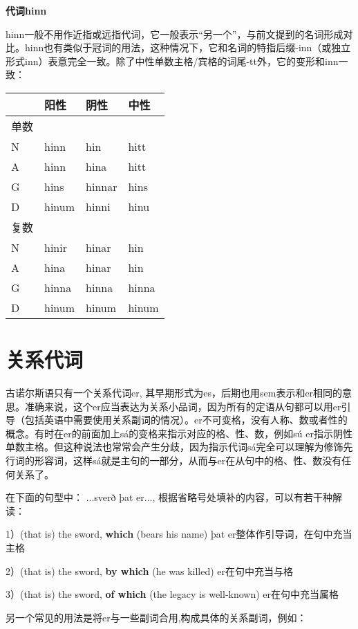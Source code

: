 \textbf{代词hinn}

hinn一般不用作近指或远指代词，它一般表示``另一个''，与前文提到的名词形成对比。hinn也有类似于冠词的用法，这种情况下，它和名词的特指后缀-inn（或独立形式inn）表意完全一致。除了中性单数主格/宾格的词尾-tt外，它的变形和inn一致：

\begin{longtable}{llll}
  \toprule
     & 阳性    & 阴性     & 中性    \\
  \midrule
  \endhead
  \bottomrule
  \endfoot
  单数 &       &        &       \\
  N  & hinn  & hin    & hitt  \\
  A  & hinn  & hina   & hitt  \\
  G  & hins  & hinnar & hins  \\
  D  & hinum & hinni  & hinu  \\
  复数 &       &        &       \\
  N  & hinir & hinar  & hin   \\
  A  & hina  & hinar  & hin   \\
  G  & hinna & hinna  & hinna \\
  D  & hinum & hinum  & hinum \\
\end{longtable}

\section{关系代词}\label{关系代词}

古诺尔斯语只有一个关系代词er,
其早期形式为es，后期也用sem表示和er相同的意思。准确来说，这个er应当表达为关系小品词，因为所有的定语从句都可以用er引导（包括英语中需要使用关系副词的情况）。er不可变格，没有人称、数或者性的概念。有时在er的前面加上sá的变格来指示对应的格、性、数，例如sú
er指示阴性单数主格。但这种说法也常常会产生分歧，因为指示代词sá完全可以理解为修饰先行词的形容词，这样sá就是主句的一部分，从而与er在从句中的格、性、数没有任何关系了。

在下面的句型中： ...sverð þat er...,
根据省略号处填补的内容，可以有若干种解读：

1）(that is) the sword, \textbf{which} (bears his name)‌ þat
er整体作引导词，在句中充当主格

2）(that is) the sword, \textbf{by which} (he was killed)‌
er在句中充当与格

3）(that is) the sword, \textbf{of which} (the legacy is well-known)‌
er在句中充当属格

另一个常见的用法是将er与一些副词合用,构成具体的关系副词，例如：

